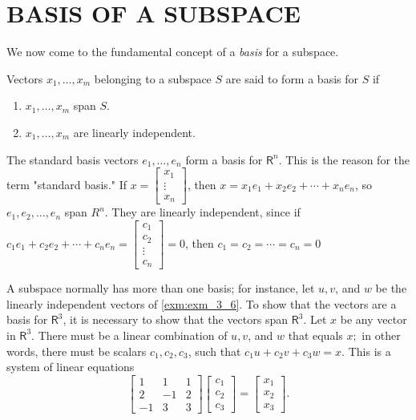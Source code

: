 \documentclass[../main.tex]{subfiles}
\begin{document}
\section[Basis of the Subspace]{BASIS OF A SUBSPACE}
We now come to the fundamental concept of a \emph{basis} for a subspace.

\begin{definition}
	\label{defn:defn_3_5}Vectors $x_{1}, \ldots, x_{m}$ belonging to a subspace $S$ are said to form a basis for $S$ if
\begin{enumerate}[label=\textbf{\arabic*. }, noitemsep]
	\item $x_{1}, \ldots, x_{m}$ span $S$.
	\item$x_{1}, \ldots, x_{m}$ are linearly independent.
\end{enumerate}
\end{definition}

\begin{example} The standard basis vectors $e_{1}, \ldots, e_{n}$ form a basis for $\mathsf{R}^{n} .$ This is the reason for the term "standard basis." If $x=\left[\begin{array}{c}x_{1} \\ \vdots \\ x_{n}\end{array}\right]$, then $x=x_{1} e_{1}+x_{2} e_{2}+\cdots+x_{n} e_{n}$, so $e_{1}, e_{2}, \ldots, e_{n}$ span $R^{n} .$ They are linearly independent, since if
$c_{1} e_{1}+c_{2} e_{2}+\cdots+c_{n} e_{n}=\left[\begin{array}{c}c_{1} \\ c_{2} \\ \vdots \\ c_{n}\end{array}\right]=0$, then $c_{1}=c_{2}=\cdots=c_{n}=0$
\end{example}

A subspace normally has more than one basis; for instance, let $u, v$, and $w$ be the linearly independent vectors of \autoref{exm:exm_3_6}.  To show that the vectors are a basis for $\mathsf{R}^{3}$, it is necessary to show that the vectors span  $\mathsf{R}^{3} .$ Let $x$ be any vector in $\mathsf{R}^{3}$. There must be a linear combination of $u, v$, and $w$ that equals $x ;$ in other words, there must be scalars $c_{1}, c_{2}, c_{3}$, such that $c_{1} u+c_{2} v+c_{3} w=x .$ This is a system of linear equations
$$
\left[\begin{array}{ccc}
1 & 1 & 1 \\
2 & -1 & 2 \\
-1 & 3 & 3
\end{array}\right]\left[\begin{array}{l}
c_{1} \\
c_{2} \\
c_{3}
\end{array}\right]=\left[\begin{array}{l}
x_{1} \\
x_{2} \\
x_{3}
\end{array}\right].
$$
\end{document}
